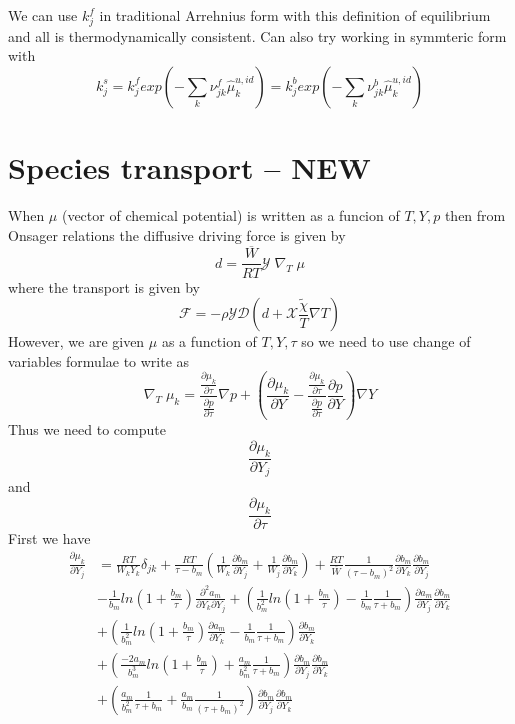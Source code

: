 \documentclass[11pt]{article}
\newcommand{\SpeciesFlux}{\boldsymbol{\mathcal{F}}}
\newcommand{\wbar}{\overline{W}}
\begin{document}
We can use $k_j^f$ in traditional Arrehnius form with this definition of equilibrium and all is thermodynamically
consistent.  Can also try working in symmteric form with
\[
k_j^s
=  k_j^f 
exp( - \sum_k \nu_{jk}^f \hat{\mu}_k^{u,id})
=  k_j^b 
exp( -  \sum_k \nu_{jk}^b \hat{\mu}_k^{u,id})
\]

\section{Species transport -- NEW}

When $\mu$ (vector of chemical potential) is written as a funcion of $T,Y,p$ then
from Onsager relations
the diffusive driving force is given by
\[
d = \frac{\wbar}{RT} \mathcal{Y} \; \nabla_T \; \mu
\]
where the transport is given by
\[
\SpeciesFlux = - \rho \mathcal{Y} \mathcal{D} ( d + \mathcal{X} \frac{ \tilde{\chi}}{T} \nabla T )
\]
However, we are given $\mu$ as a function of $T,Y,\tau$ so we need to use change of variables formulae
to write as
\[
\nabla_T \; \mu_k = 
\frac{\frac{\partial \mu_k}{\partial \tau}}
{\frac{\partial p}{\partial \tau}} \nabla p
+
\left (
\frac{\partial \mu_k}{\partial Y} -
\frac{\frac{\partial \mu_k}{\partial \tau}}
{\frac{\partial p}{\partial \tau}} 
\frac{\partial p}{\partial Y} 
\right ) \nabla Y
\]
Thus we need to compute
\[
\frac{\partial \mu_k}{\partial Y_j}
\]
and
\[
\frac{\partial \mu_k}{\partial \tau}
\]
First we have
\begin{align}
\frac{\partial \mu_k}{\partial Y_j} &=  \frac{RT}{W_k Y_k} \delta_{jk} + \frac{RT}{\tau-b_m} \left(
\frac{1}{W_k} \frac{\partial b_m}{\partial Y_j}+\frac{1}{W_j} \frac{\partial b_m}{\partial Y_k} \right )
+ \frac{RT}{\wbar} \frac{1} {(\tau - b_m)^2} \frac{\partial b_m}{\partial Y_k} \frac{\partial b_m}{\partial Y_j}  \nonumber \\
&- \frac{1}{b_m} ln ( 1 + \frac{b_m}{\tau} ) \frac{\partial^2 a_m }{\partial Y_k \partial Y_j}
+ \left ( \frac{1}{b_m^2} ln ( 1 + \frac{b_m}{\tau} ) - \frac{1}{b_m} \frac{1}{\tau+b_m}  \right)
\frac{\partial a_m }{ \partial Y_j}
\frac{\partial b_m }{\partial Y_k }
\nonumber \\
&+\left( \frac{1}{b_m^2} ln ( 1 + \frac{b_m}{\tau} ) \frac{\partial a_m}{\partial Y_k} - \frac{1}{b_m} \frac{1}{\tau+b_m} \right )
\frac{\partial b_m }{\partial Y_k } \nonumber \\
&+ \left( \frac{-2 a_m}{b_m^3} ln ( 1 + \frac{b_m}{\tau} ) + \frac{a_m}{b_m^2} \frac{1}{\tau+b_m} \right )
\frac{\partial b_m }{\partial Y_j } \frac{\partial b_m }{\partial Y_k } \nonumber \\
&+ \left( \frac{ a_m}{b_m^2} \frac{1}{\tau+b_m} + \frac{a_m}{b_m} \frac{1}{(\tau+b_m)^2} \right )
\frac{\partial b_m }{\partial Y_j } \frac{\partial b_m }{\partial Y_k }
\end{align}
\end{document}
